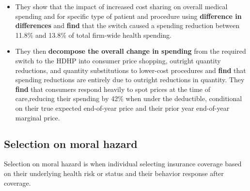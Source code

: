 \documentclass{article}
\begin{document}
\begin{itemize}
    \item They show that the impact of increased cost sharing on overall medical spending and for specific type of patient and procedure using \textbf{difference in differences} and \textbf{find} that the switch caused a spending reduction between 11.8\% and 13.8\% of total firm-wide health spending. 
    \item They then \textbf{decompose the overall change in spending} from the required switch to the HDHP into consumer price shopping, outright quantity reductions, and quantity substitutions to lower-cost procedures and \textbf{find} that spending reductions are entirely due to outright reductions in quantity. They \textbf{find} that consumers respond heavily to spot prices at the time of care,reducing their spending by 42\% when under the deductible, conditional on their true expected end-of-year price and their prior year end-of-year marginal price.
\end{itemize}

\subsection*{Selection on moral hazard}
Selection on moral hazard is when individual selecting insurance coverage based on their underlying health risk or status and their behavior response after coverage.
\end{document}
